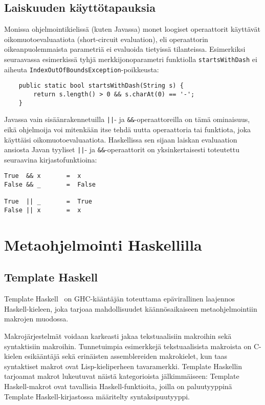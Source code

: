 \subsection{Laiskuuden käyttötapauksia}

Monissa ohjelmointikielissä (kuten Javassa) monet loogiset operaattorit käyttävät oikomuotoevaluaatiota (short-circuit evaluation),
eli operaattorin oikeanpuolemmaista parametriä ei evaluoida tietyissä tilanteissa.
Esimerkiksi seuraavassa esimerkissä tyhjä merkkijonoparametri funktiolla \texttt{startsWithDash} ei
aiheuta \texttt{IndexOutOfBoundsException}-poikkeusta:

\begin{verbatim}
    public static bool startsWithDash(String s) {
        return s.length() > 0 && s.charAt(0) == '-';
    }
\end{verbatim}

Javassa vain sisäänrakennetuilla \texttt{||}- ja \texttt{\&\&}-operaattoreilla on tämä ominaisuus,
eikä ohjelmoija voi mitenkään itse tehdä uutta operaattoria tai funktiota,
joka käyttäisi oikomuotoevaluaatiota.
Haskellissa sen sijaan laiskan evaluaation ansiosta Javan tyyliset \texttt{||}- ja \texttt{\&\&}-operaattorit on
yksinkertaisesti toteutettu seuraavina kirjastofunktioina:

\begin{verbatim}
True  && x       =  x
False && _       =  False

True  || _       =  True
False || x       =  x
\end{verbatim}

\section{Metaohjelmointi Haskellilla}
\subsection{Template Haskell}

Template Haskell~\cite{ThPaper} on GHC-kääntäjän toteuttama epävirallinen laajennos Haskell-kieleen,
joka tarjoaa mahdollisuudet käännösaikaiseen metaohjelmointiin makrojen muodossa.

Makrojärjestelmät voidaan karkeasti jakaa tekstuaalisiin makroihin sekä syntaktisiin makroihin.
Tunnetuimpia esimerkkejä tekstuaalisista makroista on C-kielen esikääntäjä sekä erinäisten assemblereiden makrokielet,
kun taas syntaktiset makrot ovat Lisp-kieliperheen tavaramerkki.
Template Haskellin tarjoamat makrot lukeutuvat näistä kategorioista jälkimmäiseen:
Template Haskell-makrot ovat tavallisia Haskell-funktioita,
joilla on paluutyyppinä Template Haskell-kirjastossa määritelty syntaksipuutyyppi.

